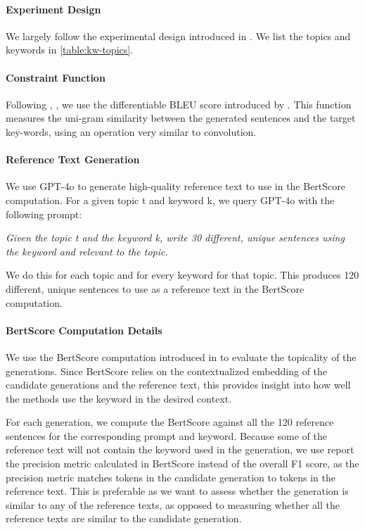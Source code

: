 \paragraph{Experiment Design}
We largely follow the experimental design introduced in \citet{liu2023bolt}. We list the topics and keywords in \ref{table:kw-topics}. 

\paragraph{Constraint Function} Following \citet{liu2023bolt}, \citet{qin2022cold}, we use the differentiable BLEU score introduced by \citet{liu-etal-2022-dont}. 
This function measures the uni-gram similarity between the generated sentences and the target key-words, using an operation very similar to convolution. 



\paragraph{Reference Text Generation} We use GPT-4o to generate high-quality reference text to use in the BertScore computation. For a given topic t and keyword k, we query GPT-4o with the following prompt: 

\textit{Given the topic t and the keyword k, write 30 different, unique sentences using the keyword and relevant to the topic.}

We do this for each topic and for every keyword for that topic. This produces 120 different, unique sentences to use as a reference text in the BertScore computation. 

\paragraph{BertScore Computation Details}
We use the BertScore computation introduced in \citet{zhang2020bertscoreevaluatingtextgeneration} to evaluate the topicality of the generations. Since BertScore relies on the contextualized embedding of the candidate generations and the reference text, this provides insight into how well the methods use the keyword in the desired context. 

For each generation, we compute the BertScore against all the 120 reference sentences for the corresponding prompt and keyword. Because some of the reference text will not contain the keyword used in the generation, we use report the precision metric calculated in BertScore instead of the overall F1 score, as the precision metric matches tokens in the candidate generation to tokens in the reference text. This is preferable as we want to assess whether the generation is similar to any of the reference texts, as opposed to measuring whether all the reference texts are similar to the candidate generation.  

